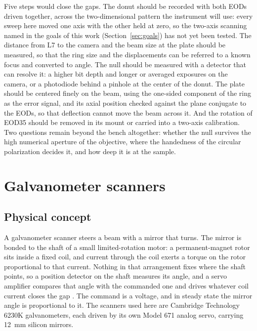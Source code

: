 \documentclass{article}
\begin{document}
Five steps would close the gaps. The donut should be recorded with both EODs driven
together, across the two-dimensional pattern the instrument will use: every sweep here moved one
axis with the other held at zero, so the two-axis scanning named in the goals of this work
(Section~\ref{sec:goals}) has not yet been tested. The distance from L7 to the camera and the beam size at the plate
should be measured, so that the ring size and the displacements can be referred to a known focus
and converted to angle. The null should be measured with a detector that can resolve it: a
higher bit depth and longer or averaged exposures on the camera, or a photodiode behind a pinhole at
the center of the donut. The plate should be centered finely on the beam, using the one-sided
component of the ring as the error signal, and its axial position checked against the plane
conjugate to the EODs, so that deflection cannot move the beam across it. And the rotation of EOD35
should be removed in its mount or carried into a two-axis calibration. Two questions remain beyond
the bench altogether: whether the null survives the high numerical aperture of the objective, where
the handedness of the circular polarization decides it, and how deep it is at the sample.

\section{Galvanometer scanners}
\label{sec:galvo}
\subsection{Physical concept}

A galvanometer scanner steers a beam with a mirror that turns. The mirror is bonded to the shaft
of a small limited-rotation motor: a permanent-magnet rotor sits inside a fixed coil, and current
through the coil exerts a torque on the rotor proportional to that current. Nothing in that
arrangement fixes where the shaft points, so a position detector on the shaft measures its angle,
and a servo amplifier compares that angle with the commanded one and drives whatever coil current
closes the gap \cite{marshallHandbookOpticalLaser2012}. The command is a voltage, and in steady
state the mirror angle is proportional to it. The scanners used here are Cambridge Technology
6230K galvanometers, each driven by its own Model 671 analog servo, carrying 12~mm silicon mirrors.
\end{document}
